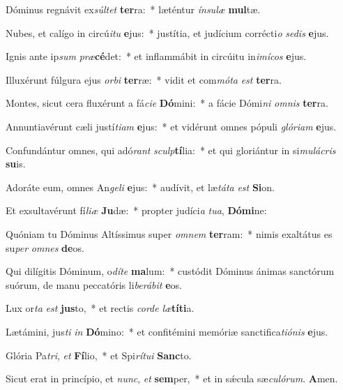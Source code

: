 \item Dóminus regnávit ex\textit{súl}\textit{tet} \textbf{ter}ra:~* læténtur \textit{ín}\textit{su}\textit{læ} \textbf{mul}tæ.
\item Nubes, et calígo in circú\textit{i}\textit{tu} \textbf{e}jus:~* justítia, et judícium corrécti\textit{o} \textit{se}\textit{dis} \textbf{e}jus.
\item Ignis ante ip\textit{sum} \textit{præ}\textbf{cé}det:~* et inflammábit in circúitu in\textit{i}\textit{mí}\textit{cos} \textbf{e}jus.
\item Illuxérunt fúlgura ejus \textit{or}\textit{bi} \textbf{ter}ræ:~* vidit et com\textit{mó}\textit{ta} \textit{est} \textbf{ter}ra.
\item Montes, sicut cera fluxérunt a fá\textit{ci}\textit{e} \textbf{Dó}mini:~* a fácie Dómi\textit{ni} \textit{om}\textit{nis} \textbf{ter}ra.
\item Annuntiavérunt cæli justí\textit{ti}\textit{am} \textbf{e}jus:~* et vidérunt omnes pópuli \textit{gló}\textit{ri}\textit{am} \textbf{e}jus.
\item Confundántur omnes, qui adó\textit{rant} \textit{sculp}\textbf{tí}lia:~* et qui gloriántur in si\textit{mu}\textit{lá}\textit{cris} \textbf{su}is.
\item Adoráte eum, omnes An\textit{ge}\textit{li} \textbf{e}jus:~* audívit, et læ\textit{tá}\textit{ta} \textit{est} \textbf{Si}on.
\item Et exsultavérunt fí\textit{li}\textit{æ} \textbf{Ju}dæ:~* propter judíci\textit{a} \textit{tu}\textit{a}, \textbf{Dó}\textbf{mi}ne:
\item Quóniam tu Dóminus Altíssimus super \textit{om}\textit{nem} \textbf{ter}ram:~* nimis exaltátus es su\textit{per} \textit{om}\textit{nes} \textbf{de}os.
\item Qui dilígitis Dóminum, o\textit{dí}\textit{te} \textbf{ma}lum:~* custódit Dóminus ánimas sanctórum suórum, de manu peccatóris li\textit{be}\textit{rá}\textit{bit} \textbf{e}os.
\item Lux or\textit{ta} \textit{est} \textbf{jus}to,~* et rectis \textit{cor}\textit{de} \textit{læ}\textbf{tí}\textbf{ti}a.
\item Lætámini, jus\textit{ti} \textit{in} \textbf{Dó}mino:~* et confitémini memóriæ sanctifica\textit{ti}\textit{ó}\textit{nis} \textbf{e}jus.
\item Glória Pa\textit{tri}, \textit{et} \textbf{Fí}lio,~* et Spi\textit{rí}\textit{tu}\textit{i} \textbf{Sanc}to.
\item Sicut erat in princípio, et \textit{nunc}, \textit{et} \textbf{sem}per,~* et in sǽcula sæ\textit{cu}\textit{ló}\textit{rum}. \textbf{A}men.
